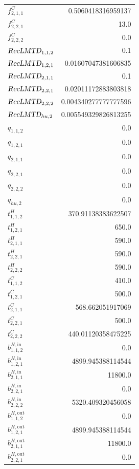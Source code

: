 \documentclass{article}%
\begin{document}
\begin{multicols*}{3}
\begin{supertabular}{lr}
	$f_{2,1,1}^{C}$ & 0.5060418316959137 \\%
	$f_{2,2,1}^{C}$ & 13.0 \\%
	$f_{2,2,2}^{C}$ & 0.0 \\%
	$\textsl{RecLMTD}_{1,1,2}$ & 0.1 \\%
	$\textsl{RecLMTD}_{1,2,1}$ & 0.01607047381606835 \\%
	$\textsl{RecLMTD}_{2,1,1}$ & 0.1 \\%
	$\textsl{RecLMTD}_{2,2,1}$ & 0.02011172883803818 \\%
	$\textsl{RecLMTD}_{2,2,2}$ & 0.004340277777777596 \\%
	$\textsl{RecLMTD}_{hu,2}$ & 0.005549329826813255 \\%
	$q_{1,1,2}$ & 0.0 \\%
	$q_{1,2,1}$ & 0.0 \\%
	$q_{2,1,1}$ & 0.0 \\%
	$q_{2,2,1}$ & 0.0 \\%
	$q_{2,2,2}$ & 0.0 \\%
	$q_{hu,2}$ & 0.0 \\%
	$t_{1,1,2}^{H}$ & 370.91138383622507 \\%
	$t_{1,2,1}^{H}$ & 650.0 \\%
	$t_{2,1,1}^{H}$ & 590.0 \\%
	$t_{2,2,1}^{H}$ & 590.0 \\%
	$t_{2,2,2}^{H}$ & 590.0 \\%
	$t_{1,1,2}^{C}$ & 410.0 \\%
	$t_{1,2,1}^{C}$ & 500.0 \\%
	$t_{2,1,1}^{C}$ & 568.662051917069 \\%
	$t_{2,2,1}^{C}$ & 500.0 \\%
	$t_{2,2,2}^{C}$ & 440.01120358475225 \\%
	$b_{1,1,2}^{H,\text{in}}$ & 0.0 \\%
	$b_{1,2,1}^{H,\text{in}}$ & 4899.945388114544 \\%
	$b_{2,1,1}^{H,\text{in}}$ & 11800.0 \\%
	$b_{2,2,1}^{H,\text{in}}$ & 0.0 \\%
	$b_{2,2,2}^{H,\text{in}}$ & 5320.409320456058 \\%
	$b_{1,1,2}^{H,\text{out}}$ & 0.0 \\%
	$b_{1,2,1}^{H,\text{out}}$ & 4899.945388114544 \\%
	$b_{2,1,1}^{H,\text{out}}$ & 11800.0 \\%
	$b_{2,2,1}^{H,\text{out}}$ & 0.0 \\%

\end{supertabular}
\end{multicols*}
\end{document}
